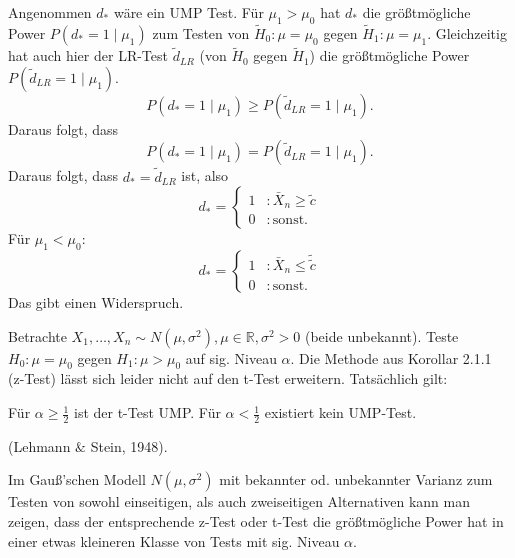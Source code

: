 \documentclass[10pt]{article}
\newcommand{\FZV}{X_1, \ldots, X_n} %
\newcommand{\IR}{\mathbb{R}} %
\newenvironment{BSP}[1][]
{\begin{Beispiel}[frametitle=#1]}{\end{Beispiel}}
\newenvironment{BWS}[1][]
{\begin{Beweis}[frametitle=#1]}{\end{Beweis}}
\begin{document}
			\begin{BWS}[Beweis 2.1.3 (Kein UMP-Test bei Normalverteilung)]
				Angenommen $d_{*}$ wäre ein UMP Test. Für $\mu_1 > \mu_0$ hat $d_{*}$ die größtmögliche Power $P(d_{*} = 1 \mid \mu_1)$ zum Testen von $\tilde{H}_0: \mu = \mu_0$ gegen $\tilde{H}_1: \mu = \mu_1$. Gleichzeitig hat auch hier der LR-Test $\tilde{d}_{LR}$ (von $\tilde{H}_0$ gegen $\tilde{H}_1$) die größtmögliche Power $P(\tilde{d}_{LR} = 1 \mid \mu_1)$.
				\begin{equation*}
					P(d_{*} = 1 \mid \mu_1) \geq P(\tilde{d}_{LR} = 1 \mid \mu_1).
				\end{equation*}
				Daraus folgt, dass
				\begin{equation*}
					P(d_{*} = 1 \mid \mu_1) = P(\tilde{d}_{LR} = 1 \mid \mu_1). 
				\end{equation*}
				Daraus folgt, dass $d_{*} = \tilde{d}_{LR}$ ist, also 
				\begin{equation*}
					d_{*} = \begin{cases}
						1 &: \bar{X}_n \geq \tilde{c}\\
						0 &: \text{sonst}. 
					\end{cases}
				\end{equation*}
				Für $\mu_1 < \mu_0$:
					\begin{equation*}
					d_{*} = \begin{cases}
						1 &: \bar{X}_n \leq \tilde{\tilde{c}}\\
						0 &: \text{sonst}. 
					\end{cases}
				\end{equation*}
				Das gibt einen Widerspruch. 
			\end{BWS}
			\begin{BSP}[Beispiel 2.1.5 (Lehmann und Stein)]
				Betrachte $\FZV \sim N(\mu, \sigma^2), \mu \in \IR, \sigma^2 >0$ (beide unbekannt). Teste $H_0: \mu = \mu_0$ gegen $H_1: \mu > \mu_0$ auf sig. Niveau $\alpha$. Die Methode aus Korollar 2.1.1 (z-Test) lässt sich leider nicht auf den t-Test erweitern. Tatsächlich gilt:
				
				Für $\alpha \geq \frac{1}{2}$ ist der t-Test UMP. 
				Für $\alpha < \frac{1}{2}$ existiert kein UMP-Test.
				
				(Lehmann $\&$ Stein, 1948). 
			\end{BSP}
			
			\begin{Bemerkung}
				Im Gauß'schen Modell $N(\mu, \sigma^2)$ mit bekannter od. unbekannter Varianz zum Testen von sowohl einseitigen, als auch zweiseitigen Alternativen kann man zeigen, dass der entsprechende z-Test oder t-Test die größtmögliche Power hat in einer etwas kleineren Klasse von Tests mit sig. Niveau $\alpha$. 
			\end{Bemerkung}
			
\end{document}
